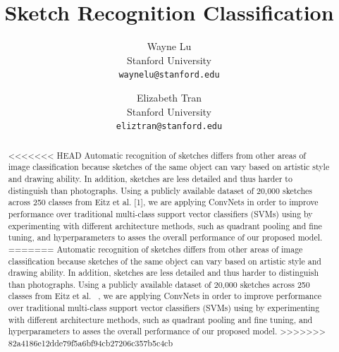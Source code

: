 \documentclass[10pt,twocolumn,letterpaper]{article}
\begin{document}
\title{Sketch Recognition Classification}

\author{Wayne Lu\\
Stanford University \\
{\tt\small waynelu@stanford.edu}
\and
Elizabeth Tran\\
Stanford University\\
{\tt\small eliztran@stanford.edu}
}

\maketitle

\begin{abstract}
<<<<<<< HEAD
 Automatic recognition of sketches differs from other areas of image classification because sketches of the same object can vary based on artistic style and drawing ability. In addition, sketches are less detailed and thus harder to distinguish than photographs. Using a publicly available dataset of 20,000 sketches across 250 classes from Eitz et al. [1], we are applying ConvNets in order to improve performance over traditional multi-class support vector classifiers (SVMs) using by experimenting with different architecture methods, such as quadrant pooling and fine tuning, and hyperparameters to asses the overall performance of our proposed model. 
=======
 Automatic recognition of sketches differs from other areas of image classification because sketches of the same object can vary based on artistic style and drawing ability. In addition, sketches are less detailed and thus harder to distinguish than photographs. Using a publicly available dataset of 20,000 sketches across 250 classes from Eitz et al. ~\cite{eitz2012hdhso}, we are applying ConvNets in order to improve performance over traditional multi-class support vector classifiers (SVMs) using by experimenting with different architecture methods, such as quadrant pooling and fine tuning, and hyperparameters to asses the overall performance of our proposed model. 
>>>>>>> 82a4186e12dde79f5a6bf94cb27206c357b5c4cb
\end{abstract}

\end{document}
